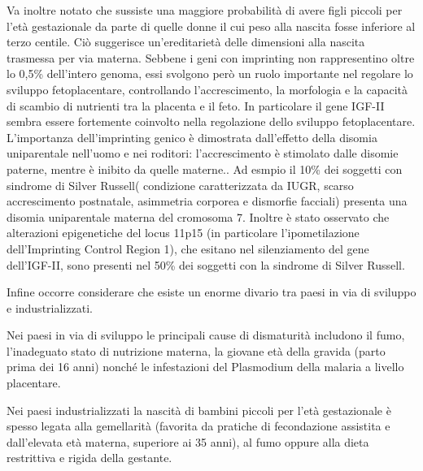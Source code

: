 Va inoltre notato che sussiste una maggiore probabilità di avere figli piccoli per l'et\`a gestazionale
da parte di quelle donne il cui peso alla nascita fosse inferiore al terzo centile.
Ciò suggerisce un'ereditarietà delle dimensioni alla nascita trasmessa per via materna. Sebbene
i geni con imprinting non rappresentino oltre lo 0,5\% dell'intero genoma, essi svolgono
però un ruolo importante nel regolare lo sviluppo fetoplacentare, controllando l'accrescimento, la 
morfologia e la capacità di scambio di nutrienti tra la placenta e il feto.
In particolare il gene IGF-II sembra essere fortemente coinvolto nella regolazione dello sviluppo
fetoplacentare. L'importanza dell'imprinting genico è dimostrata dall'effetto della disomia uniparentale
nell'uomo e nei roditori: l'accrescimento è stimolato dalle disomie paterne, mentre \`e inibito da quelle materne.\cite{fowden2006imprinted}.
Ad esmpio il 10\% dei soggetti con sindrome di Silver Russell( condizione caratterizzata da IUGR, scarso accrescimento postnatale, asimmetria corporea e dismorfie facciali) presenta una disomia uniparentale materna del cromosoma 7. Inoltre è stato osservato che alterazioni epigenetiche del locus 11p15 (in particolare l'ipometilazione dell'Imprinting Control Region 1), che esitano nel silenziamento del gene dell'IGF-II, sono presenti nel 50\% dei soggetti con la sindrome di Silver Russell\cite{gicquel2005epimutation}.



Infine occorre considerare che esiste un enorme divario tra paesi in via di sviluppo e industrializzati.


Nei paesi in via di sviluppo le principali cause di dismaturità includono il fumo, l'inadeguato stato di 
nutrizione materna, la giovane età della gravida (parto prima dei 16 anni) nonché le infestazioni del Plasmodium della malaria a 
livello placentare.


Nei paesi industrializzati la nascità di bambini piccoli per l'età gestazionale
è spesso legata alla gemellarità (favorita da pratiche di fecondazione assistita
e dall'elevata età materna, superiore ai 35 anni), al fumo oppure alla dieta restrittiva e rigida della gestante.



